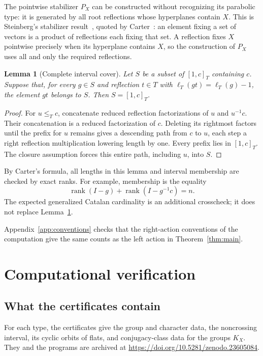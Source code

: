 \documentclass[11pt]{article}
\newtheorem{lemma}[theorem]{Lemma}
\newcommand{\rank}{\operatorname{rank}}
\begin{document}
The pointwise stabilizer $P_X$ can be constructed without recognizing
its parabolic type: it is generated by all root reflections whose
hyperplanes contain $X$. This is Steinberg's stabilizer result~\cite{Steinberg1968}, quoted by
Carter~\cite[Section~2, Lemma~1]{Carter}: an element fixing a set of
vectors is a product of reflections each fixing that set. A reflection
fixes $X$ pointwise precisely when its hyperplane contains $X$, so the
construction of $P_X$ uses all and only the required reflections.

\begin{lemma}[Complete interval cover]\label{lem:cover}
Let $S$ be a subset of $[1,c]_T$ containing $c$. Suppose that, for
every $g\in S$ and reflection $t\in T$ with
$\ell_T(gt)=\ell_T(g)-1$, the element $gt$ belongs to $S$. Then
$S=[1,c]_T$.
\end{lemma}

\begin{proof}
For $u\leq_T c$, concatenate reduced reflection factorizations of
$u$ and $u^{-1}c$. Their concatenation is a reduced factorization
of $c$. Deleting its rightmost factors until the prefix for $u$
remains gives a descending path from $c$ to $u$, each step a right
reflection multiplication lowering length by one. Every prefix lies
in $[1,c]_T$. The closure assumption forces this entire path, including
$u$, into $S$.
\end{proof}

By Carter's formula, all lengths in this lemma and interval membership
are checked by exact ranks. For example, membership is the equality
\[
 \rank(I-g)+\rank(I-g^{-1}c)=n.
\]
The expected generalized Catalan cardinality is an additional
crosscheck; it does not replace Lemma~\ref{lem:cover}.

Appendix~\ref{app:conventions} checks that the right-action
conventions of the computation give the same counts as the left action
in Theorem~\ref{thm:main}.

\section{Computational verification}\label{sec:computation}
\subsection{What the certificates contain}
For each type, the certificates give the group and character data, the
noncrossing interval, its cyclic orbits of flats, and conjugacy-class
data for the groups $K_X$. They and the programs are archived at
\url{https://doi.org/10.5281/zenodo.23605084}.
\end{document}
